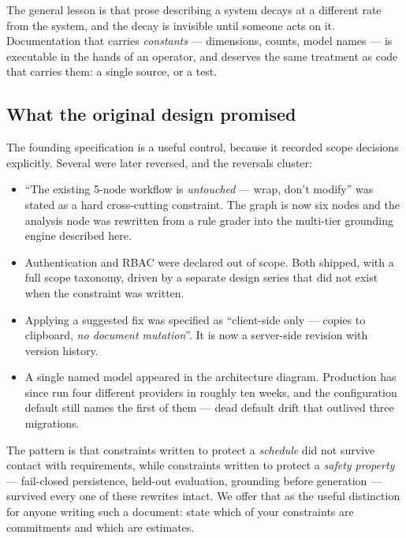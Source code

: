 \documentclass[10pt]{article}
\begin{document}
The general lesson is that prose describing a system decays at a different rate
from the system, and the decay is invisible until someone acts on it.
Documentation that carries \emph{constants} --- dimensions, counts, model names
--- is executable in the hands of an operator, and deserves the same treatment
as code that carries them: a single source, or a test.

\subsection{What the original design promised}

The founding specification is a useful control, because it recorded scope
decisions explicitly. Several were later reversed, and the reversals cluster:

\begin{itemize}
  \item ``The existing 5-node workflow is \emph{untouched} --- wrap, don't
        modify'' was stated as a hard cross-cutting constraint. The graph is
        now six nodes and the analysis node was rewritten from a rule grader
        into the multi-tier grounding engine described here.
  \item Authentication and RBAC were declared out of scope. Both shipped, with
        a full scope taxonomy, driven by a separate design series that did not
        exist when the constraint was written.
  \item Applying a suggested fix was specified as ``client-side only ---
        copies to clipboard, \emph{no document mutation}''. It is now a
        server-side revision with version history.
  \item A single named model appeared in the architecture diagram. Production
        has since run four different providers in roughly ten weeks, and the
        configuration default still names the first of them --- dead default
        drift that outlived three migrations.
\end{itemize}

The pattern is that constraints written to protect a \emph{schedule} did not
survive contact with requirements, while constraints written to protect a
\emph{safety property} --- fail-closed persistence, held-out evaluation,
grounding before generation --- survived every one of these rewrites intact. We
offer that as the useful distinction for anyone writing such a document: state
which of your constraints are commitments and which are estimates.
\end{document}
